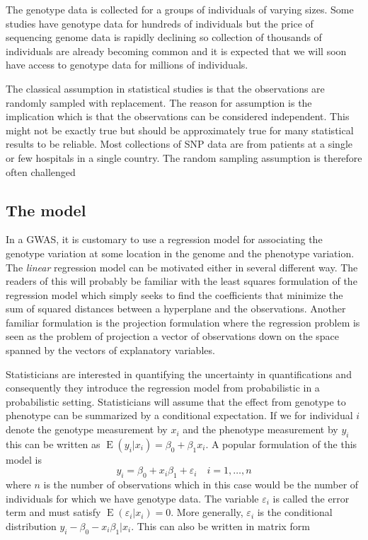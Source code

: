 \documentclass[final,leqno]{siamltex1213}
\DeclareMathOperator{\E}{E}
\begin{document}
The genotype data is collected for a groups of individuals of varying sizes. Some studies have genotype data for hundreds of individuals but the price of sequencing genome data is rapidly declining so collection of thousands of individuals are already becoming common and it is expected that we will soon  have access to genotype data for millions of individuals.

The classical assumption in statistical studies is that the observations are randomly sampled with replacement. The reason for assumption is the implication which is that the observations can be considered independent. This might not be exactly true but should be approximately true for many statistical results to be reliable. Most collections of SNP data are from patients at a single or few hospitals in a single country. The random sampling assumption is therefore often challenged

\subsection{The model}
In a GWAS, it is customary to use a regression model for associating the genotype variation at some location in the genome and the phenotype variation. The \emph{linear} regression model can be motivated either in several different way. The readers of this will probably be familiar with the least squares formulation of the regression model which simply seeks to find the coefficients that minimize the sum of squared distances between a hyperplane and the observations. Another familiar formulation is the projection formulation where the regression problem is seen as the problem of projection a vector of observations down on the space spanned by the vectors of explanatory variables.

Statisticians are interested in quantifying the uncertainty in quantifications and consequently they introduce the regression model from probabilistic in a probabilistic setting. Statisticians will assume that the effect from genotype to phenotype can be summarized by a conditional expectation. If we for individual $i$ denote the genotype measurement by $x_i$ and the phenotype measurement by $y_i$ this can be written as $\E(y_i|x_i)=\beta_0 + \beta_1 x_i$. A popular formulation of the this model is
\begin{equation*}
    y_i = \beta_0 + x_i \beta_1 + \varepsilon_i\quad i=1,\dots,n
\end{equation*}
where $n$ is the number of observations which in this case would be the number of individuals for which we have genotype data. The variable $\varepsilon_i$ is called the error term and must satisfy $\E(\varepsilon_i|x_i)=0$. More generally, $\varepsilon_i$ is the conditional distribution $y_i - \beta_0 - x_i\beta_1|x_i$. This can also be written in matrix form
\end{document}
